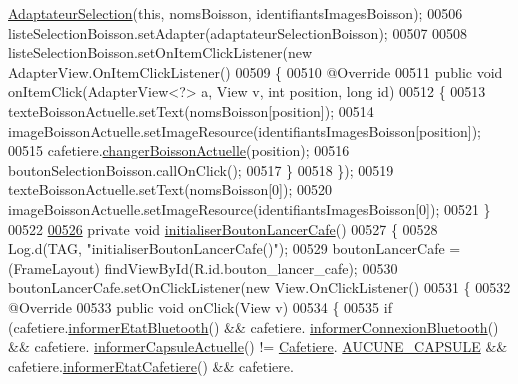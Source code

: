 \begin{DoxyCode}
      \hyperlink{classcom_1_1example_1_1ekawa_1_1_ihm_1_1_adaptateur_selection_a41746ec1a290651b4cacb0894a32307b}{AdaptateurSelection}(\textcolor{keyword}{this}, nomsBoisson, identifiantsImagesBoisson);
00506         listeSelectionBoisson.setAdapter(adaptateurSelectionBoisson);
00507 
00508         listeSelectionBoisson.setOnItemClickListener(\textcolor{keyword}{new} AdapterView.OnItemClickListener()
00509         \{
00510             @Override
00511             \textcolor{keyword}{public} \textcolor{keywordtype}{void} onItemClick(AdapterView<?> a, View v, \textcolor{keywordtype}{int} position, \textcolor{keywordtype}{long} \textcolor{keywordtype}{id})
00512             \{
00513                 texteBoissonActuelle.setText(nomsBoisson[position]);
00514                 imageBoissonActuelle.setImageResource(identifiantsImagesBoisson[position]);
00515                 cafetiere.\hyperlink{classcom_1_1example_1_1ekawa_1_1_cafetiere_a50775b093a7f6d1b0fe8ad3662d80fc5}{changerBoissonActuelle}(position);
00516                 boutonSelectionBoisson.callOnClick();
00517             \}
00518         \});
00519         texteBoissonActuelle.setText(nomsBoisson[0]);
00520         imageBoissonActuelle.setImageResource(identifiantsImagesBoisson[0]);
00521     \}
00522 
\hyperlink{classcom_1_1example_1_1ekawa_1_1_ihm_a6616a5f240867f43c8e56f2b432e43be}{00526}     \textcolor{keyword}{private} \textcolor{keywordtype}{void} \hyperlink{classcom_1_1example_1_1ekawa_1_1_ihm_a6616a5f240867f43c8e56f2b432e43be}{initialiserBoutonLancerCafe}()
00527     \{
00528         Log.d(TAG, \textcolor{stringliteral}{"initialiserBoutonLancerCafe()"});
00529         boutonLancerCafe = (FrameLayout) findViewById(R.id.bouton\_lancer\_cafe);
00530         boutonLancerCafe.setOnClickListener(\textcolor{keyword}{new} View.OnClickListener()
00531         \{
00532             @Override
00533             \textcolor{keyword}{public} \textcolor{keywordtype}{void} onClick(View v)
00534             \{
00535                 \textcolor{keywordflow}{if} (cafetiere.\hyperlink{classcom_1_1example_1_1ekawa_1_1_cafetiere_aeff88ad385713a7897074dcdb76077a5}{informerEtatBluetooth}() && cafetiere.
      \hyperlink{classcom_1_1example_1_1ekawa_1_1_cafetiere_a97d9ca4701a961fe8865ecfa1d5bf64a}{informerConnexionBluetooth}() && cafetiere.
      \hyperlink{classcom_1_1example_1_1ekawa_1_1_cafetiere_a3251d1865f3a4113553e1743a971984d}{informerCapsuleActuelle}() != \hyperlink{classcom_1_1example_1_1ekawa_1_1_cafetiere}{Cafetiere}.
      \hyperlink{classcom_1_1example_1_1ekawa_1_1_cafetiere_a5a23a636fa5f2e5826458e700f453c16}{AUCUNE\_CAPSULE} && cafetiere.\hyperlink{classcom_1_1example_1_1ekawa_1_1_cafetiere_a4253a092cf9c84f7b97021e628d5bfb4}{informerEtatCafetiere}() && cafetiere.

\end{DoxyCode}
